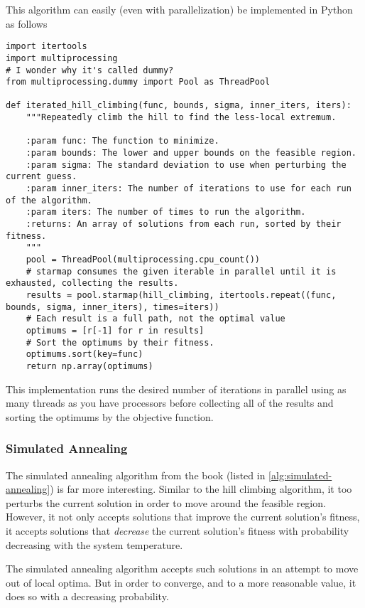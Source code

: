 \documentclass{article}
\begin{document}
This algorithm can easily (even with parallelization) be implemented in Python as follows
\begin{verbatim}
import itertools
import multiprocessing
# I wonder why it's called dummy?
from multiprocessing.dummy import Pool as ThreadPool

def iterated_hill_climbing(func, bounds, sigma, inner_iters, iters):
    """Repeatedly climb the hill to find the less-local extremum.

    :param func: The function to minimize.
    :param bounds: The lower and upper bounds on the feasible region.
    :param sigma: The standard deviation to use when perturbing the current guess.
    :param inner_iters: The number of iterations to use for each run of the algorithm.
    :param iters: The number of times to run the algorithm.
    :returns: An array of solutions from each run, sorted by their fitness.
    """
    pool = ThreadPool(multiprocessing.cpu_count())
    # starmap consumes the given iterable in parallel until it is exhausted, collecting the results.
    results = pool.starmap(hill_climbing, itertools.repeat((func, bounds, sigma, inner_iters), times=iters))
    # Each result is a full path, not the optimal value
    optimums = [r[-1] for r in results]
    # Sort the optimums by their fitness.
    optimums.sort(key=func)
    return np.array(optimums)
\end{verbatim}
This implementation runs the desired number of iterations in parallel using as many threads as you
have processors before collecting all of the results and sorting the optimums by the objective
function.

\subsubsection{Simulated Annealing}

The simulated annealing algorithm from the book (listed in \autoref{alg:simulated-annealing}) is
far more interesting. Similar to the hill climbing algorithm, it too perturbs the current solution
in order to move around the feasible region. However, it not only accepts solutions that improve
the current solution's fitness, it accepts solutions that \textit{decrease} the current solution's
fitness with probability decreasing with the system temperature.

The simulated annealing algorithm accepts such solutions in an attempt to move out of local optima.
But in order to converge, and to a more reasonable value, it does so with a decreasing probability.
\end{document}
